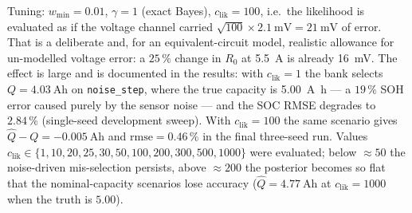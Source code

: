 Tuning: $w_{\min}=0.01$, $\gamma=1$ (exact Bayes), $c_{\text{lik}}=100$, i.e.\ the likelihood is
evaluated as if the voltage channel carried $\sqrt{100}\times\SI{2.1}{\milli\volt}=\SI{21}{\milli\volt}$
of error.  That is a deliberate and, for an equivalent-circuit model, realistic allowance for
un-modelled voltage error: a $25\,\%$ change in $R_0$ at \SI{5.5}{\ampere} is already
\SI{16}{\milli\volt}.  The effect is large and is documented in the results: with $c_{\text{lik}}=1$
the bank selects $Q=\SI{4.03}{\ampere\hour}$ on \texttt{noise\_step}, where the true capacity is
\SI{5.00}{\ampere\hour} --- a $19\,\%$ SOH error caused purely by the sensor noise --- and the SOC
RMSE degrades to $2.84\,\%$ (single-seed development sweep).  With $c_{\text{lik}}=100$ the same
scenario gives $\hat Q-Q=\SI{-0.005}{\ampere\hour}$ and $\mathrm{rmse}=0.46\,\%$ in the final
three-seed run.  Values
$c_{\text{lik}}\in\{1,10,20,25,30,50,100,200,300,500,1000\}$ were evaluated; below $\approx50$ the
noise-driven mis-selection persists, above $\approx200$ the posterior becomes so flat that the
nominal-capacity scenarios lose accuracy ($\hat Q=\SI{4.77}{\ampere\hour}$ at $c_{\text{lik}}=1000$
when the truth is $5.00$).

